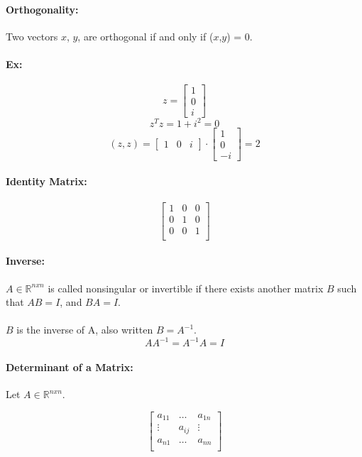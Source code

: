 \documentclass{article}
\begin{document}
\paragraph{Orthogonality:} Two vectors $x$, $y$, are orthogonal if and only if ($x$,$y$) = 0.

\paragraph{Ex:} 
\[
  z = 
  \begin{bmatrix}
      1 \\ 0 \\ i
  \end{bmatrix}
\]
\[
  z^Tz = 1 + i^2 = 0
\]
\[
    (z,z) = 
    \begin{bmatrix}
        1 & 0 & i
    \end{bmatrix}
    \cdot
    \begin{bmatrix}
    1 \\ 0 \\ -i
    \end{bmatrix}
    =
    2
\]
\paragraph{Identity Matrix:}
\[
    \begin{bmatrix}
        1 & 0 & 0\\
        0 & 1 & 0\\
        0 & 0 & 1\\
    \end{bmatrix}
\]
\paragraph{Inverse:} $A \in \mathbb{R}^{n x n}$ is called nonsingular or invertible if there exists
another matrix $B$ such that $AB = I$, and $BA = I$. 

\paragraph{} $B$ is the inverse of A, also written $B = A^{-1}$.
\[
AA^{-1} = A^{-1}A = I 
\]

\paragraph{Determinant of a Matrix:} Let $A \in \mathbb{R}^{nxn}$. 

\[
  \begin{bmatrix}
      a_{11} &\ldots  & a_{1n}\\
      \vdots & a_{ij} & \vdots\\
      a_{n1} & \ldots & a_{nn}\\
  \end{bmatrix} 
\]
\end{document}
